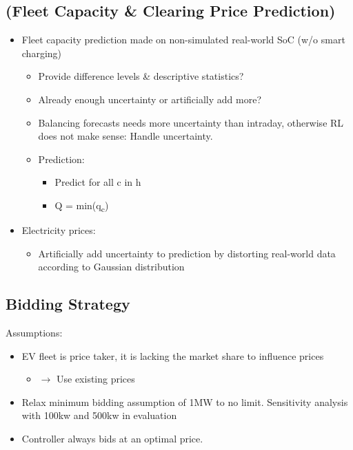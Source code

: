\documentclass[a4paper, 12pt]{article}
\begin{document}
\subsection{(Fleet Capacity \& Clearing Price Prediction)}
\label{sec:org3929c2a}
\begin{itemize}
\item Fleet capacity prediction made on non-simulated real-world SoC (w/o smart charging)
\begin{itemize}
\item Provide difference levels \& descriptive statistics?
\item Already enough uncertainty or artificially add more?
\item Balancing forecasts needs more uncertainty than intraday, otherwise RL does
not make sense: Handle uncertainty.
\item Prediction:
\begin{itemize}
\item Predict for all c in h
\item Q = min(q\textsubscript{c})
\end{itemize}
\end{itemize}

\item Electricity prices:
\begin{itemize}
\item Artificially add uncertainty to prediction by distorting real-world data
according to Gaussian distribution
\end{itemize}
\end{itemize}

\subsection{Bidding Strategy \label{sec-model-bidding-strategy}}
\label{sec:org8b258f8}
Assumptions:
\begin{itemize}
\item EV fleet is price taker, it is lacking the market share to influence prices
\begin{itemize}
\item \(\rightarrow\) Use existing prices
\end{itemize}
\item Relax minimum bidding assumption of 1MW to no limit. Sensitivity analysis
with 100kw and 500kw in evaluation
\item Controller always bids at an optimal price.
\end{itemize}
\end{document}

